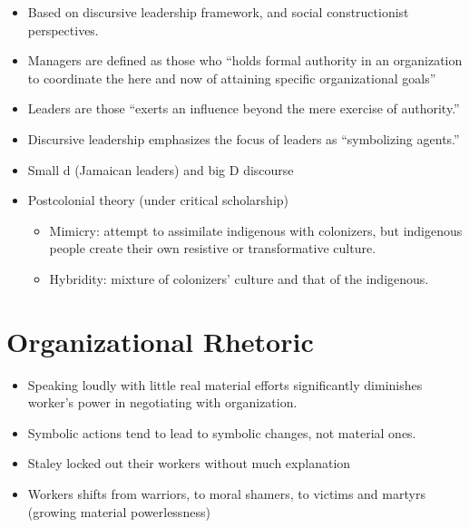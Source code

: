 \documentclass[
]{book}
\begin{document}
\begin{itemize}
\item
  Based on discursive leadership framework, and social constructionist perspectives.
\item
  Managers are defined as those who ``holds formal authority in an organization to coordinate the here and now of attaining specific organizational goals''
\item
  Leaders are those ``exerts an influence beyond the mere exercise of authority.''
\item
  Discursive leadership emphasizes the focus of leaders as ``symbolizing agents.''
\item
  Small d (Jamaican leaders) and big D discourse
\item
  Postcolonial theory (under critical scholarship)

  \begin{itemize}
  \item
    Mimicry: attempt to assimilate indigenous with colonizers, but indigenous people create their own resistive or transformative culture.
  \item
    Hybridity: mixture of colonizers' culture and that of the indigenous.
  \end{itemize}
\end{itemize}

\hypertarget{organizational-rhetoric}{%
\chapter{Organizational Rhetoric}\label{organizational-rhetoric}}

\citep{Cloud_2005}

\begin{itemize}
\item
  Speaking loudly with little real material efforts significantly diminishes worker's power in negotiating with organization.
\item
  Symbolic actions tend to lead to symbolic changes, not material ones.
\item
  Staley locked out their workers without much explanation
\item
  Workers shifts from warriors, to moral shamers, to victims and martyrs (growing material powerlessness)
\end{itemize}

\citep{Meisenbach_2008}
\end{document}
